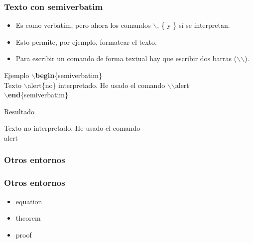 \documentclass[aspectratio=1610]{beamer}%
\newcommand\rojo[1]{\textcolor[RGB]{237,41,57}{#1}}
\begin{document}
\begin{frame}[fragile]
\frametitle{\textbf{Texto con semiverbatim}}
\justifying
 
 \begin{itemize}\justifying
  \item Es como verbatim, pero ahora los comandos \rojo{$\backslash$}, \rojo{\{} y \rojo{\}} sí se interpretan.
  \item Esto permite, por ejemplo, formatear el texto.
  \item Para escribir un comando de forma textual hay que escribir dos barras (\rojo{$\backslash$$\backslash$}).
\end{itemize}
\begin{exampleblock}{Ejemplo}
$\backslash$\textbf{begin}\{semiverbatim\}\\
  Texto $\backslash$\rojo{alert}\{no\} interpretado. He usado el comando $\backslash$$\backslash$alert\\
$\backslash$\textbf{end}\{semiverbatim\}
\end{exampleblock}

\begin{block}{Resultado}
\begin{semiverbatim}
  Texto \alert{no} interpretado. He usado el comando \\alert
\end{semiverbatim}
\end{block}
\end{frame}
\subsubsection{Otros entornos}
\begin{frame}[fragile]
\frametitle{\textbf{Otros entornos}}
\justifying
 \begin{itemize}\justifying
  \item equation
  \item theorem
  \item proof
\end{itemize}

\end{frame}
\end{document}
